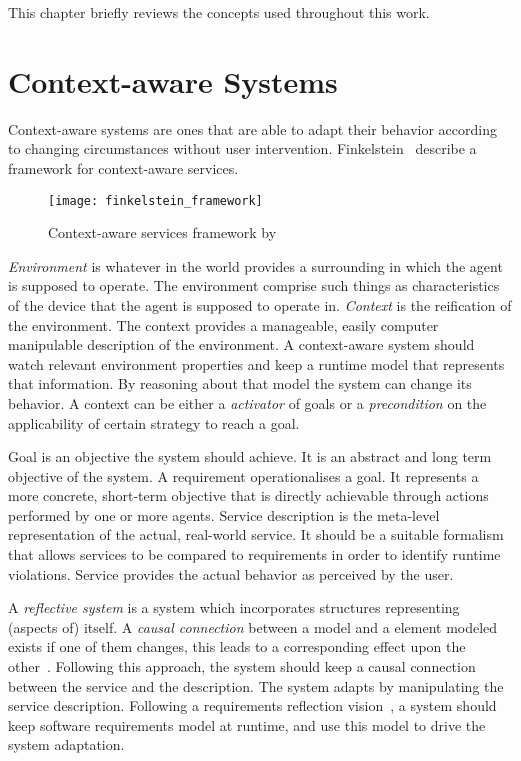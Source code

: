 This chapter briefly reviews the concepts used throughout this work.


\section{Context-aware Systems}
Context-aware systems are ones that are able to adapt their behavior according to changing circumstances without user intervention. Finkelstein~\cite{finkelstein_framework_2001} describe a framework for context-aware services.

\begin{figure}[!htb]
  \centering
  \texttt{[image: finkelstein\_framework]}
  \caption{Context-aware services framework by~\cite{finkelstein_framework_2001}}
\label{fig:finkelstein_framework}
\end{figure}

\emph{Environment} is whatever in the world provides a surrounding in which the agent is supposed to operate. The environment comprise such things as characteristics of the device that the agent is supposed to operate in.
\emph{Context} is the reification of the environment. The context provides a manageable, easily computer manipulable description of the environment. A context-aware system should watch relevant environment properties and keep a runtime model that represents that information. By reasoning about that model the system can change its behavior. A context can be either a \emph{activator} of goals or a \emph{precondition} on the applicability of certain strategy to reach a goal.

Goal is an objective the system should achieve. It is an abstract and long term objective of the system. A requirement operationalises a goal. It represents a more concrete, short-term objective that is directly achievable through actions performed by one or more agents. Service description is the meta-level representation of the actual, real-world service. It should be a suitable formalism that allows services to be compared to requirements in order to identify runtime violations. Service provides the actual behavior as perceived by the user.

A \emph{reflective system} is a system which incorporates structures representing (aspects of) itself. A \emph{causal connection} between a model and a element modeled exists if one of them changes, this leads to a corresponding effect upon the other~\cite{maes_concepts_1987}. Following this approach, the system should keep a causal connection between the service and the description. The system adapts by manipulating the service description.
Following a requirements reflection vision~\cite{bencomo_requirements_2010}, a system should keep software requirements model at runtime, and use this model to drive the system adaptation.
